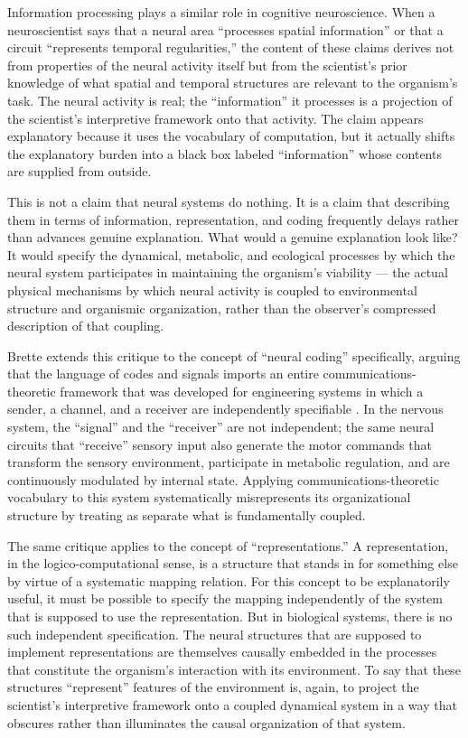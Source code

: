 \documentclass[12pt,a4paper]{report}
\theoremstyle{flyxion}
\begin{document}
Information processing plays a similar role in cognitive neuroscience. When a neuroscientist says that a neural area ``processes spatial information'' or that a circuit ``represents temporal regularities,'' the content of these claims derives not from properties of the neural activity itself but from the scientist's prior knowledge of what spatial and temporal structures are relevant to the organism's task. The neural activity is real; the ``information'' it processes is a projection of the scientist's interpretive framework onto that activity. The claim appears explanatory because it uses the vocabulary of computation, but it actually shifts the explanatory burden into a black box labeled ``information'' whose contents are supplied from outside.

This is not a claim that neural systems do nothing. It is a claim that describing them in terms of information, representation, and coding frequently delays rather than advances genuine explanation. What would a genuine explanation look like? It would specify the dynamical, metabolic, and ecological processes by which the neural system participates in maintaining the organism's viability --- the actual physical mechanisms by which neural activity is coupled to environmental structure and organismic organization, rather than the observer's compressed description of that coupling.

Brette extends this critique to the concept of ``neural coding'' specifically, arguing that the language of codes and signals imports an entire communications-theoretic framework that was developed for engineering systems in which a sender, a channel, and a receiver are independently specifiable \cite{brettepredictive}. In the nervous system, the ``signal'' and the ``receiver'' are not independent; the same neural circuits that ``receive'' sensory input also generate the motor commands that transform the sensory environment, participate in metabolic regulation, and are continuously modulated by internal state. Applying communications-theoretic vocabulary to this system systematically misrepresents its organizational structure by treating as separate what is fundamentally coupled.

The same critique applies to the concept of ``representations.'' A representation, in the logico-computational sense, is a structure that stands in for something else by virtue of a systematic mapping relation. For this concept to be explanatorily useful, it must be possible to specify the mapping independently of the system that is supposed to use the representation. But in biological systems, there is no such independent specification. The neural structures that are supposed to implement representations are themselves causally embedded in the processes that constitute the organism's interaction with its environment. To say that these structures ``represent'' features of the environment is, again, to project the scientist's interpretive framework onto a coupled dynamical system in a way that obscures rather than illuminates the causal organization of that system.
\end{document}
